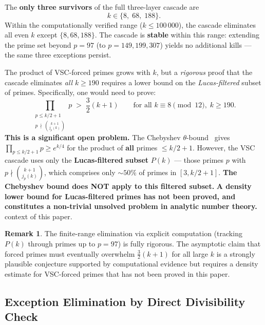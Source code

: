 \documentclass[12pt,a4paper]{article}
\theoremstyle{plain}
\theoremstyle{definition}
\newtheorem{remark}[theorem]{Remark}
\begin{document}
The \textbf{only three survivors} of the full three-layer cascade are
\[\label{eq:exceptions}
  k \in \{8,\; 68,\; 188\}.
\]
Within the computationally verified range ($k \le 100\,000$), the cascade
eliminates all even $k$ except $\{8, 68, 188\}$.  The cascade is
\textbf{stable} within this range: extending the prime set beyond
$p = 97$ (to $p = 149, 199, 307$) yields no additional kills --- the
same three exceptions persist.

The product of VSC-forced primes grows with $k$, but a
\emph{rigorous} proof that the cascade eliminates \emph{all} $k \ge 190$
requires a lower bound on the \emph{Lucas-filtered} subset of primes.
Specifically, one would need to prove:
\begin{equation}\label{eq:vsc-gap}
  \prod_{\substack{p \le k/2+1 \\ p \, \nmid \, \binom{k+1}{j_p(k)}}} p
  \; > \; \frac{3}{2}(k+1)
  \qquad \text{for all } k \equiv 8 \pmod{12},\; k \ge 190.
\end{equation}
\textbf{This is a significant open problem.}  The Chebyshev
$\theta$-bound~\cite{Chebyshev} gives
$\prod_{p \le k/2+1} p \ge e^{k/4}$ for the product of \textbf{all}
primes $\le k/2+1$.  However, the VSC cascade uses only the
\textbf{Lucas-filtered subset} $P(k)$ --- those primes $p$ with
$p \nmid \binom{k+1}{j_p(k)}$, which comprises only $\sim 50\%$ of
primes in $[3, k/2+1]$.  \textbf{The Chebyshev bound does NOT apply
to this filtered subset.}  \textbf{A density lower bound for
Lucas-filtered primes has not been proved, and constitutes a
non-trivial unsolved problem in analytic number theory.}
context of this paper.

\begin{remark}
  The finite-range elimination via explicit computation (tracking
  $P(k)$ through primes up to $p = 97$) is fully rigorous.  The
  asymptotic claim that forced primes must eventually overwhelm
  $\frac{3}{2}(k+1)$ for all large $k$ is a strongly plausible
  conjecture supported by computational evidence but requires a
  density estimate for VSC-forced primes that has not been proved
  in this paper.
\end{remark}

\subsection{Exception Elimination by Direct Divisibility Check}
\label{sec:exceptions}
\end{document}

